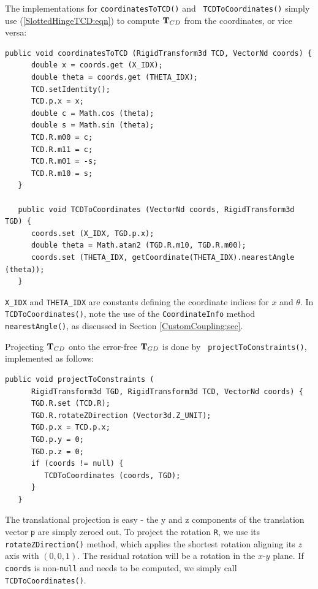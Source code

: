 The implementations for {\tt coordinatesToTCD()} and {\tt
TCDToCoordinates()} simply use (\ref{SlottedHingeTCD:eqn}) to
compute ${\bf T}_{CD}$ from the coordinates, or vice versa:
%
\begin{lstlisting}[]
   public void coordinatesToTCD (RigidTransform3d TCD, VectorNd coords) {
      double x = coords.get (X_IDX);
      double theta = coords.get (THETA_IDX);
      TCD.setIdentity();
      TCD.p.x = x;
      double c = Math.cos (theta);
      double s = Math.sin (theta);
      TCD.R.m00 = c;
      TCD.R.m11 = c;
      TCD.R.m01 = -s;
      TCD.R.m10 = s;
   }
   
   public void TCDToCoordinates (VectorNd coords, RigidTransform3d TGD) {
      coords.set (X_IDX, TGD.p.x);
      double theta = Math.atan2 (TGD.R.m10, TGD.R.m00);
      coords.set (THETA_IDX, getCoordinate(THETA_IDX).nearestAngle (theta));
   }
\end{lstlisting}
%
{\tt X\_IDX} and {\tt THETA\_IDX} are constants defining the
coordinate indices for $x$ and $\theta$. In {\tt TCDToCoordinates()},
note the use of the {\tt CoordinateInfo} method {\tt
nearestAngle()}, as discussed in Section
\ref{CustomCoupling:sec}.

Projecting ${\bf T}_{CD}$ onto the error-free ${\bf T}_{GD}$ is done by {\tt
projectToConstraints()}, implemented as follows:
%
\begin{lstlisting}[]
   public void projectToConstraints (
      RigidTransform3d TGD, RigidTransform3d TCD, VectorNd coords) {
      TGD.R.set (TCD.R);
      TGD.R.rotateZDirection (Vector3d.Z_UNIT);
      TGD.p.x = TCD.p.x;
      TGD.p.y = 0;
      TGD.p.z = 0;
      if (coords != null) {
         TCDToCoordinates (coords, TGD);
      }
   }
\end{lstlisting}
%
The translational projection is easy - the y and z components of the
translation vector {\tt p} are simply zeroed out. To project the
rotation {\tt R}, we use its {\tt rotateZDirection()} method, which
applies the shortest rotation aligning its $z$ axis with $(0, 0,
1)$. The residual rotation will be a rotation in the $x$-$y$ plane.
If {\tt coords} is non-{\tt null} and needs to be computed, we simply
call {\tt TCDToCoordinates()}.

